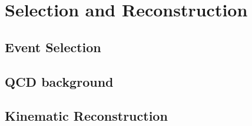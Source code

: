 \chapter{Selection and Reconstruction}
\label{sec:selection}

\section{Event Selection}

\section{QCD background}
\label{sec:qcdbckg}

\section{Kinematic Reconstruction}
